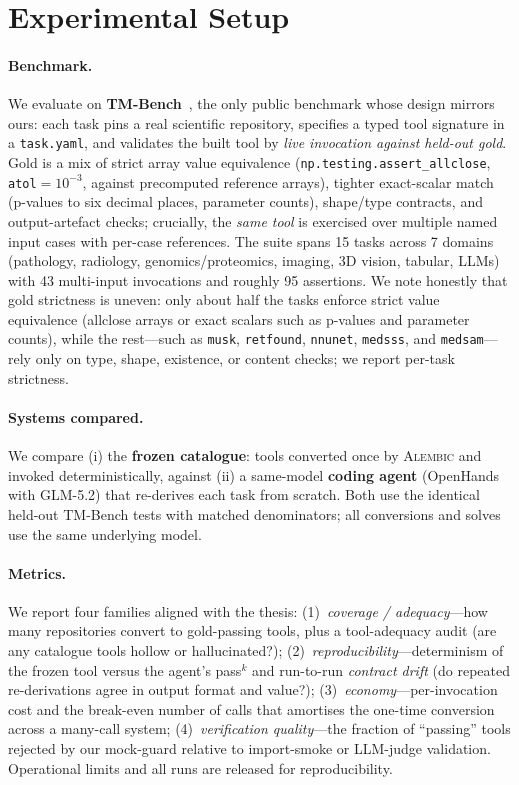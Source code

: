 \section{Experimental Setup}

\paragraph{Benchmark.}
We evaluate on \textbf{TM-Bench}~\citep{wolflein2025toolmaker_acl}, the only
public benchmark whose design mirrors ours: each task pins a real scientific
repository, specifies a typed tool signature in a \texttt{task.yaml}, and
validates the built tool by \emph{live invocation against held-out gold}. Gold
is a mix of strict array value equivalence
(\texttt{np.testing.assert\_allclose}, \texttt{atol}$=$$10^{-3}$, against
precomputed reference arrays), tighter exact-scalar match (p-values to six
decimal places, parameter counts),
shape/type contracts, and output-artefact checks; crucially, the \emph{same
tool} is exercised over multiple named input cases with per-case references. The
suite spans 15 tasks across 7 domains (pathology, radiology, genomics/proteomics,
imaging, 3D vision, tabular, LLMs) with 43 multi-input invocations and roughly
95 assertions. We note honestly that gold strictness is uneven: only about half
the tasks enforce strict value equivalence (allclose arrays or exact scalars
such as p-values and parameter counts), while the rest---such as \texttt{musk},
\texttt{retfound}, \texttt{nnunet}, \texttt{medsss}, and \texttt{medsam}---rely
only on type, shape, existence, or content checks; we report per-task strictness. 

\paragraph{Systems compared.}
We compare (i) the \textbf{frozen catalogue}: tools converted once by
\textsc{Alembic} and invoked deterministically, against (ii) a same-model
\textbf{coding agent} (OpenHands with GLM-5.2) that re-derives each task from
scratch. Both use the identical held-out TM-Bench tests with matched
denominators; all conversions and solves use the same underlying model.

\paragraph{Metrics.}
We report four families aligned with the thesis:
(1)~\emph{coverage / adequacy}---how many repositories convert to gold-passing
tools, plus a tool-adequacy audit (are any catalogue tools hollow or
hallucinated?);
(2)~\emph{reproducibility}---determinism of the frozen tool versus the agent's
pass$^k$ and run-to-run \emph{contract drift} (do repeated re-derivations agree
in output format and value?);
(3)~\emph{economy}---per-invocation cost and the break-even number of calls that
amortises the one-time conversion across a many-call system;
(4)~\emph{verification quality}---the fraction of ``passing'' tools rejected by
our mock-guard relative to import-smoke or LLM-judge validation.
Operational limits and all runs are released for reproducibility.
